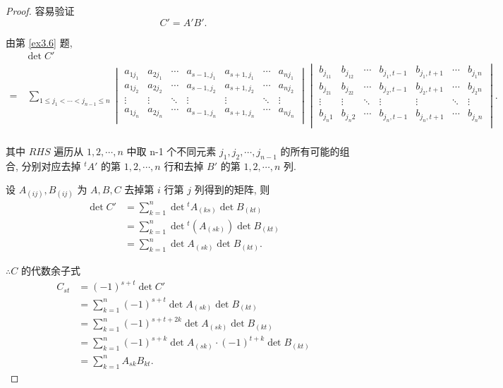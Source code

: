 \documentclass{ctexart}
\begin{document}
\begin{proof}
    容易验证
    \[C'=A'B'.\]

    由第 \ref{ex3.6} 题,
    \setlength\arraycolsep{2pt}
    \begin{align*}
        & \det C' \\
        = & \ \sum\limits_{1\leq j_1<\cdots<j_{n-1}\leq n}\begin{vmatrix}
        a_{1j_1} & a_{2j_1} & \cdots & a_{s-1,j_1} & a_{s+1,j_1} & \cdots & a_{nj_1} \\
        a_{1j_2} & a_{2j_2} & \cdots & a_{s-1,j_2} & a_{s+1,j_2} & \cdots & a_{nj_2} \\
        \vdots   & \vdots   & \ddots & \vdots      & \vdots      & \ddots & \vdots \\
        a_{1j_n} & a_{2j_n} & \cdots & a_{s-1,j_n} & a_{s+1,j_n} & \cdots & a_{nj_n} \\
    \end{vmatrix}\begin{vmatrix}
        b_{j_11} & b_{j_12} & \cdots  & b_{j_1,t-1}  & b_{j_1,t+1} & \cdots & b_{j_1n} \\
        b_{j_21} & b_{j_22} & \cdots  & b_{j_2,t-1}  & b_{j_2,t+1} & \cdots & b_{j_2n} \\
        \vdots   & \vdots   & \ddots  & \vdots   & \vdots  & \ddots & \vdots \\
        b_{j_n1} & b_{j_n2} & \cdots  & b_{j_n,t-1}  & b_{j_n,t+1} & \cdots & b_{j_nn} \\
    \end{vmatrix}. \\
    \end{align*}

    其中 $RHS$ 遍历从 $1,2,\cdots,n$ 中取 n-1 个不同元素 $j_1,j_2,\cdots,j_{n-1}$ 的所有可能的组合, 分别对应去掉 ${}^tA'$ 的第 $1,2,\cdots,n$ 行和去掉 $B'$ 的第 $1,2,\cdots,n$ 列.

    设 $A_{(ij)},B_{(ij)}$ 为 $A,B,C$ 去掉第 $i$ 行第 $j$ 列得到的矩阵, 则
    \begin{align*}
        \det C' & =\sum\limits_{k=1}^n\det{}^tA_{(ks)}\det B_{(kt)} \\
        & =\sum\limits_{k=1}^n\det{}^t(A_{(sk)})\det B_{(kt)} \\
        & =\sum\limits_{k=1}^n\det A_{(sk)}\det B_{(kt)}.
    \end{align*}

    $\therefore C$ 的代数余子式
    \begin{align*}
        C_{st} & =(-1)^{s+t}\det C' \\
        & =\sum\limits_{k=1}^n(-1)^{s+t}\det A_{(sk)}\det B_{(kt)} \\
        & =\sum\limits_{k=1}^n(-1)^{s+t+2k}\det A_{(sk)}\det B_{(kt)} \\
        & =\sum\limits_{k=1}^n(-1)^{s+k}\det A_{(sk)}\cdot(-1)^{t+k}\det B_{(kt)} \\
        & =\sum\limits_{k=1}^nA_{sk}B_{kt}.
    \end{align*}


\end{proof}
\end{document}
